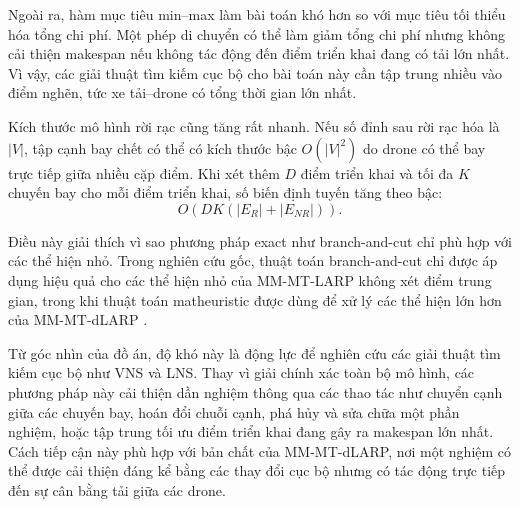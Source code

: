 Ngoài ra, hàm mục tiêu min--max làm bài toán khó hơn so với mục tiêu tối thiểu hóa tổng chi phí. Một phép di chuyển có thể làm giảm tổng chi phí nhưng không cải thiện makespan nếu không tác động đến điểm triển khai đang có tải lớn nhất. Vì vậy, các giải thuật tìm kiếm cục bộ cho bài toán này cần tập trung nhiều vào điểm nghẽn, tức xe tải--drone có tổng thời gian lớn nhất.

Kích thước mô hình rời rạc cũng tăng rất nhanh. Nếu số đỉnh sau rời rạc hóa là $|V|$, tập cạnh bay chết có thể có kích thước bậc $O(|V|^2)$ do drone có thể bay trực tiếp giữa nhiều cặp điểm. Khi xét thêm $D$ điểm triển khai và tối đa $K$ chuyến bay cho mỗi điểm triển khai, số biến định tuyến tăng theo bậc:
\begin{equation}
O\left(DK\left(|E_R| + |E_{NR}|\right)\right).
\end{equation}

Điều này giải thích vì sao phương pháp exact như branch-and-cut chỉ phù hợp với các thể hiện nhỏ. Trong nghiên cứu gốc, thuật toán branch-and-cut chỉ được áp dụng hiệu quả cho các thể hiện nhỏ của MM-MT-LARP không xét điểm trung gian, trong khi thuật toán matheuristic được dùng để xử lý các thể hiện lớn hơn của MM-MT-dLARP \cite{corberan2025mmdlarp}.

Từ góc nhìn của đồ án, độ khó này là động lực để nghiên cứu các giải thuật tìm kiếm cục bộ như VNS và LNS. Thay vì giải chính xác toàn bộ mô hình, các phương pháp này cải thiện dần nghiệm thông qua các thao tác như chuyển cạnh giữa các chuyến bay, hoán đổi chuỗi cạnh, phá hủy và sửa chữa một phần nghiệm, hoặc tập trung tối ưu điểm triển khai đang gây ra makespan lớn nhất. Cách tiếp cận này phù hợp với bản chất của MM-MT-dLARP, nơi một nghiệm có thể được cải thiện đáng kể bằng các thay đổi cục bộ nhưng có tác động trực tiếp đến sự cân bằng tải giữa các drone.
